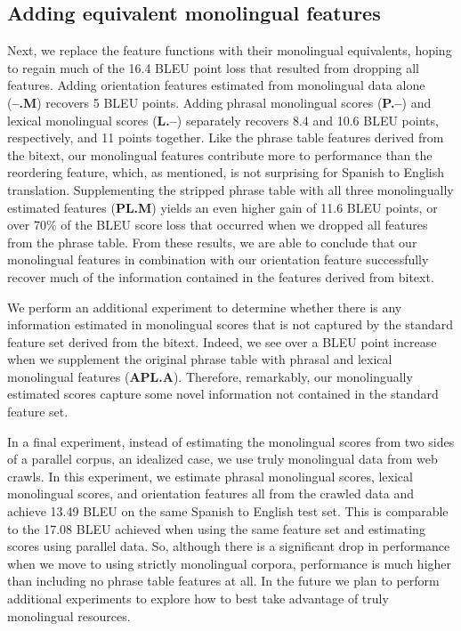 \documentclass[11pt]{article}
\begin{document}
\subsection{Adding equivalent monolingual features} \label{sect:exp:replacement}

Next, we replace the feature functions with their monolingual equivalents, hoping to regain much of the 16.4 BLEU point loss that resulted from dropping all features.  Adding orientation features estimated from monolingual data alone ({\bf --.M})  recovers 5 BLEU points. Adding phrasal monolingual scores ({\bf P.--}) and lexical monolingual scores ({\bf L.--}) separately recovers 8.4 and 10.6 BLEU points, respectively, and 11 points together. Like the phrase table features derived from the bitext, our monolingual features contribute more to performance than the reordering feature, which, as mentioned, is not surprising for Spanish to English translation. Supplementing the stripped phrase table with all three monolingually estimated features ({\bf PL.M}) yields an even higher gain of 11.6 BLEU points, or over 70\% of the BLEU score loss that occurred when we dropped all features from the phrase table. From these results, we are able to conclude that our monolingual features in combination with our orientation feature successfully recover much of the information contained in the features derived from bitext. 

We perform an additional experiment to determine whether there is any information estimated in monolingual scores that is not captured by the standard feature set derived from the bitext. Indeed, we see over a BLEU point increase when we supplement the original phrase table with phrasal and lexical monolingual features ({\bf APL.A}). Therefore, remarkably, our monolingually estimated scores capture some novel information not contained in the standard feature set.

In a final experiment, instead of estimating the monolingual scores from two sides of a parallel corpus, an idealized case, we use truly monolingual data from web crawls. In this experiment, we estimate phrasal monolingual scores, lexical monolingual scores, and orientation features all from the crawled data and achieve 13.49 BLEU on the same Spanish to English test set. This is comparable to the 17.08 BLEU achieved when using the same feature set and estimating scores using parallel data. So, although there is a significant drop in performance when we move to using strictly monolingual corpora, performance is much higher than including no phrase table features at all. In the future we plan to perform additional experiments to explore how to best take advantage of truly monolingual resources.
\end{document}
